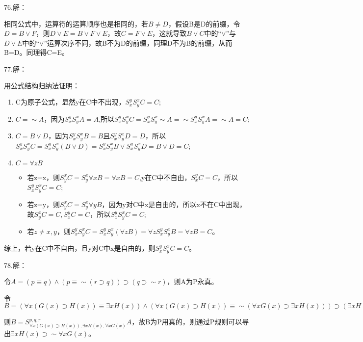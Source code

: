 \documentclass[a4paper]{ctexart}
\begin{document}
\noindent 76.解：

相同公式中，运算符的运算顺序也是相同的，若$B\neq D$，假设B是D的前缀，令$D=B\vee F$，则$D\vee E=B\vee F\vee E$，故$C=F\vee E$，这就导致$B\vee C$中的“$\vee$”与$D\vee E$中的“$\vee$”运算次序不同，故B不为D的前缀，同理D不为B的前缀，从而B=D。同理得C=E。\newline
  
\noindent 77.解：

用公式结构归纳法证明：
\begin{enumerate}
  \item C为原子公式，显然y在C中不出现，$S_x^yS_y^xC=C$;
  \item $C=\sim A$，因为$S_x^yS_y^xA=A$,所以$S_x^yS_y^xC=S_x^yS_y^x\sim A=\sim S_x^yS_y^xA=\sim A=C$;
  \item $C=B\vee D$，因为$S_x^yS_y^xB=B$且$S_x^yS_y^xD=D$，所以$S_x^yS_y^xC=S_x^yS_y^x(B\vee D)=S_x^yS_y^xB\vee S_x^yS_y^xD=B\vee D=C$;
  \item $C=\forall{z}B$
  \begin{itemize}
    \item 若z=x，则$S^x_yC=S^x_y\forall{x}B=\forall{x}B=C$,y在C中不自由，$S^y_xC=C$，所以$S_x^yS_y^xC=C$;
    \item 若z=y，则$S^x_yC=S^x_y\forall{y}B$，因为y对C中x是自由的，所以x不在C中出现，故$S^x_yC=C,S^y_xC=C$，所以$S_x^yS_y^xC=C$;
    \item 若$z\neq x,y$，则$S_x^yS_y^xC=S_x^yS_y^x(\forall{z}B)=\forall{z}S_x^yS_y^xB=\forall{z}B=C$。
  \end{itemize}
\end{enumerate}
综上，若y在C中不自由，且y对C中x是自由的，则$S_x^yS_y^xC=C$。

\noindent 78.解：

令$A=(p\equiv q)\wedge(p\equiv\sim(r\supset q))\supset (q\supset\sim r)$，则A为P永真。

令$B=(\forall{x}(G(x)\supset H(x))\equiv \exists{x}H(x))\wedge (\forall{x}(G(x)\supset H(x))\equiv \sim(\forall{x}G(x)\supset \exists{x}H(x)))\supset(\exists{x}H(x)\supset\sim\forall{x}G(x))$

则$B=S^{p,q,r}_{\forall{x}(G(x)\supset H(x)),\exists{x}H(x),\forall{x}G(x)}A$，故B为P用真的，则通过P规则可以导出$\exists{x}H(x)\supset\sim\forall{x}G(x)$。\newline
\end{document}
